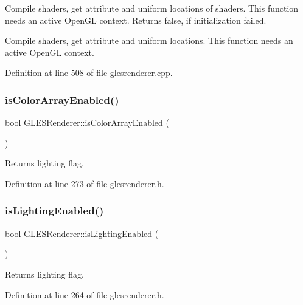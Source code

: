 Compile shaders, get attribute and uniform locations of shaders. This function needs an active Open\+GL context. Returns false, if initialization failed.

Compile shaders, get attribute and uniform locations. This function needs an active Open\+GL context. 

Definition at line 508 of file glesrenderer.\+cpp.

\mbox{\label{class_g_l_e_s_renderer_a79ef99aaf1e080612cad7ce4e77580bd}} 
\subsubsection{\texorpdfstring{isColorArrayEnabled()}{isColorArrayEnabled()}}
{\footnotesize\ttfamily bool G\+L\+E\+S\+Renderer\+::is\+Color\+Array\+Enabled (\begin{DoxyParamCaption}{ }\end{DoxyParamCaption})\hspace{0.3cm}{\ttfamily [inline]}}

Returns lighting flag. 

Definition at line 273 of file glesrenderer.\+h.

\mbox{\label{class_g_l_e_s_renderer_a72a9b248926c08a45dfea70b8f0e22ca}} 
\subsubsection{\texorpdfstring{isLightingEnabled()}{isLightingEnabled()}}
{\footnotesize\ttfamily bool G\+L\+E\+S\+Renderer\+::is\+Lighting\+Enabled (\begin{DoxyParamCaption}{ }\end{DoxyParamCaption})\hspace{0.3cm}{\ttfamily [inline]}}

Returns lighting flag. 

Definition at line 264 of file glesrenderer.\+h.

\mbox{\label{class_g_l_e_s_renderer_a256990132d3f0ceff02a369db1361c2c}} 
